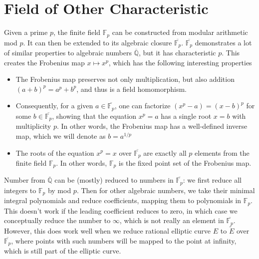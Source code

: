 \documentclass[]{article}
\begin{document}
\section{Field of Other Characteristic}
Given a prime $p$, the finite field $\mathbb{F}_p$ can be constructed from modular arithmetic mod $p$. It can then be extended to its algebraic closure $\overline{\mathbb{F}_p}$. $\overline{\mathbb{F}_p}$ demonstrates a lot of similar properties to algebraic numbers $\overline{\mathbb{Q}}$, but it has characteristic $p$. This creates the Frobenius map $x \mapsto x^p$, which has the following interesting properties
\begin{itemize}
	\item The Frobenius map preserves not only multiplication, but also addition $(a+b)^p = a^p + b^p$, and thus is a field homomorphism.
	\item Consequently, for a given $a \in \overline{\mathbb{F}_p}$, one can factorize $(x^p - a) = (x - b)^p$ for some $b \in \overline{\mathbb{F}_p}$, showing that the equation $x^p = a$ has a single root $x = b$ with multiplicity $p$. In other words, the Frobenius map has a well-defined inverse map, which we will denote as $b = a^{1/p}$
	\item The roots of the equation $x^p = x$ over $\overline{\mathbb{F}_p}$ are exactly all $p$ elements from the finite field $\mathbb{F}_p$. In other words, $\mathbb{F}_p$ is the fixed point set of the Frobenius map.
\end{itemize}

Number from $\overline{\mathbb{Q}}$ can be (mostly) reduced to numbers in $\overline{\mathbb{F}_p}$: we first reduce all integers to $\mathbb{F}_p$ by mod $p$. Then for other algebraic numbers, we take their minimal integral polynomials and reduce coefficients, mapping them to polynomials in $\mathbb{F}_p$. This doesn't work if the leading coefficient reduces to zero, in which case we conceptually reduce the number to $\infty$, which is not really an element in $\overline{\mathbb{F}_p}$. However, this does work well when we reduce rational elliptic curve $E$ to $\tilde{E}$ over $\overline{\mathbb{F}_p}$, where points with such numbers will be mapped to the point at infinity, which is still part of the elliptic curve.
\end{document}
